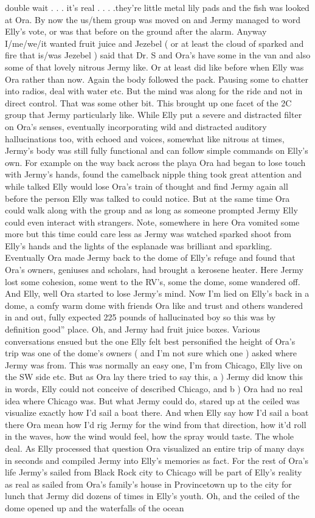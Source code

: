 \documentclass[12pt]{book}
\begin{document}
double wait . . . it's real . . . .they're little metal lily pads and the fish was looked at Ora. By now the us/them group was moved on and Jermy managed to word Elly's vote, or was that before on the ground after the alarm. Anyway I/me/we/it wanted fruit juice and Jezebel ( or at least the cloud of sparked and fire that is/was Jezebel ) said that Dr. S and Ora's have some in the van and also some of that lovely nitrous Jermy like. Or at least did like before when Elly was Ora rather than now. Again the body followed the pack. Pausing some to chatter into radios, deal with water etc. But the mind was along for the ride and not in direct control. That was some other bit. This brought up one facet of the 2C group that Jermy particularly like. While Elly put a severe and distracted filter on Ora's senses, eventually incorporating wild and distracted auditory hallucinations too, with echoed and voices, somewhat like nitrous at times, Jermy's body was still fully functional and can follow simple commands on Elly's own. For example on the way back across the playa Ora had began to lose touch with Jermy's hands, found the camelback nipple thing took great attention and while talked Elly would lose Ora's train of thought and find Jermy again all before the person Elly was talked to could notice. But at the same time Ora could walk along with the group and as long as someone prompted Jermy Elly could even interact with strangers. Note, somewhere in here Ora vomited some more but this time could care less as Jermy was watched sparked shoot from Elly's hands and the lights of the esplanade was brilliant and sparkling. Eventually Ora made Jermy back to the dome of Elly's refuge and found that Ora's owners, geniuses and scholars, had brought a kerosene heater. Here Jermy lost some cohesion, some went to the RV's, some the dome, some wandered off. And Elly, well Ora started to lose Jermy's mind. Now I'm lied on Elly's back in a dome, a comfy warm dome with friends Ora like and trust and others wandered in and out, fully expected 225 pounds of hallucinated boy so this was by definition good'' place. Oh, and Jermy had fruit juice boxes. Various conversations ensued but the one Elly felt best personified the height of Ora's trip was one of the dome's owners ( and I'm not sure which one ) asked where Jermy was from. This was normally an easy one, I'm from Chicago, Elly live on the SW side etc. But as Ora lay there tried to say this, a ) Jermy did know this in words, Elly could not conceive of described Chicago, and b ) Ora had no real idea where Chicago was. But what Jermy could do, stared up at the ceiled was visualize exactly how I'd sail a boat there. And when Elly say how I'd sail a boat there Ora mean how I'd rig Jermy for the wind from that direction, how it'd roll in the waves, how the wind would feel, how the spray would taste. The whole deal. As Elly processed that question Ora visualized an entire trip of many days in seconds and compiled Jermy into Elly's memories as fact. For the rest of Ora's life Jermy's sailed from Black Rock city to Chicago will be part of Elly's reality as real as sailed from Ora's family's house in Provincetown up to the city for lunch that Jermy did dozens of times in Elly's youth. Oh, and the ceiled of the dome opened up and the waterfalls of the ocean 
\end{document}

